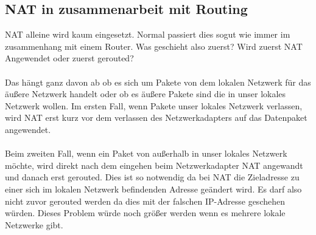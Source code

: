 \subsection{NAT in zusammenarbeit mit Routing}
NAT alleine wird kaum eingesetzt. Normal passiert dies sogut wie immer im zusammenhang mit einem Router. Was geschieht also zuerst? Wird zuerst NAT Angewendet oder zuerst gerouted?
\\\\
Das hängt ganz davon ab ob es sich um Pakete von dem lokalen Netzwerk für das äußere Netzwerk handelt oder ob es äußere Pakete sind die in unser lokales Netzwerk wollen.
Im ersten Fall, wenn Pakete unser lokales Netzwerk verlassen, wird NAT erst kurz vor dem verlassen des Netzwerkadapters auf das Datenpaket angewendet. 
\\\\
Beim zweiten Fall, wenn ein Paket von außerhalb in unser lokales Netzwerk möchte, wird direkt nach dem eingehen beim Netzwerkadapter NAT angewandt und danach erst gerouted. Dies ist so notwendig da bei NAT die Zieladresse zu einer sich im lokalen Netzwerk befindenden Adresse geändert wird. Es darf also nicht zuvor gerouted werden da dies mit der falschen IP-Adresse geschehen würden. Dieses Problem würde noch größer werden wenn es mehrere lokale Netzwerke gibt.


